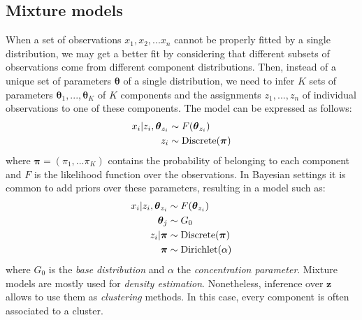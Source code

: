 \documentclass[smallextended]{svjour3}          %
\begin{document}
\subsection{Mixture models}\label{sec:mixturemodels}
When a set of observations $x_1,x_2,...x_n$ cannot be properly fitted by a single distribution, we may get a better fit by considering that different subsets of observations come from different component distributions. Then, instead of a unique set of parameters $\boldsymbol{\theta}$ of a single distribution, we need to infer $K$ sets of parameters $\boldsymbol{\theta}_1,...,\boldsymbol{\theta}_K$ of $K$ components and the assignments $z_1,...,z_n$ of individual observations to one of these components. The model can be expressed as follows:
\begin{align}
x_i | z_i, \boldsymbol{\theta}_{z_i} &\sim F(\boldsymbol{\theta}_{z_i})\notag\\
z_i &\sim \text{Discrete}(\boldsymbol{\pi})
\end{align}
where $\boldsymbol{\pi} = (\pi_1,...\pi_K)$ contains the probability of belonging to each component and $F$ is the likelihood function over the observations. In Bayesian settings it is common to add priors over these parameters, resulting in a model such as:
\begin{align}
x_i | z_i, \boldsymbol{\theta}_{z_i} &\sim F(\boldsymbol{\theta}_{z_i})\notag\\
\boldsymbol{\theta}_j &\sim G_0\notag\\
z_i | \boldsymbol{\pi} &\sim \text{Discrete}(\boldsymbol{\pi})\notag\\
\boldsymbol{\pi} &\sim \text{Dirichlet}(\alpha)
\end{align}
where $G_0$ is the \emph{base distribution} and $\alpha$ the \textit{concentration parameter}. Mixture models are mostly used for \textit{density estimation}. Nonetheless, inference over $\mathbf{z}$ allows to use them as \textit{clustering} methods. In this case, every component is often associated to a cluster.


\end{document}

